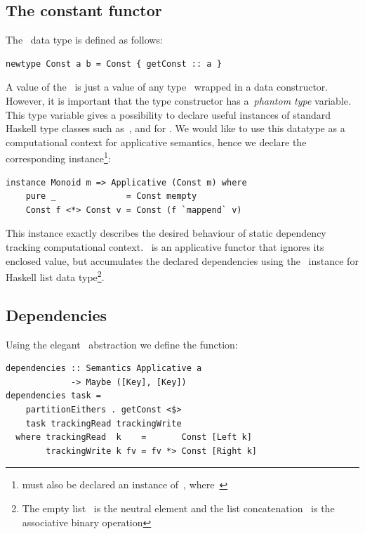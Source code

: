 \subsection{The constant functor}

The~ data type is defined as follows:

\begin{verbatim}
newtype Const a b = Const { getConst :: a }
\end{verbatim}

A value of the~ is just a value of any type~
wrapped in a data constructor. However, it is important that the type constructor
has a~\emph{phantom type} variable. This type variable gives a possibility to
declare useful instances of standard Haskell type classes such as~,
 and  for . We would like to use this
datatype as a computational context for applicative semantics, hence we declare
the corresponding instance\footnote{ must also be declared an instance
of~, where~}:

\begin{verbatim}
instance Monoid m => Applicative (Const m) where
    pure _              = Const mempty
    Const f <*> Const v = Const (f `mappend` v)
\end{verbatim}

This instance exactly describes the desired behaviour of static dependency tracking
computational context.~ is an applicative functor that ignores
its enclosed value, but accumulates the declared dependencies using the~
instance for Haskell list data type\footnote{The empty list~\hs{[]} is the
neutral element and the list concatenation~\hs{(++)} is the associative binary operation}.

\subsection{Dependencies}

Using the elegant~ abstraction we define the  function:

\begin{verbatim}
dependencies :: Semantics Applicative a
             -> Maybe ([Key], [Key])
dependencies task =
    partitionEithers . getConst <$>
    task trackingRead trackingWrite
  where trackingRead  k    =       Const [Left k]
        trackingWrite k fv = fv *> Const [Right k]
\end{verbatim}

